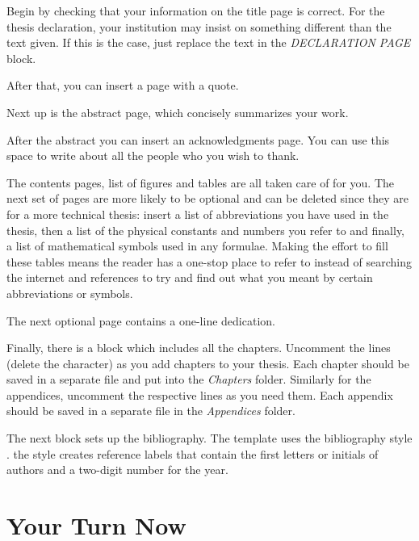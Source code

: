 Begin%
 by checking that your information on the title page is correct. For the thesis declaration, your institution may insist on something different than the text given. If this is the case, just replace the text in the \emph{DECLARATION PAGE} block.

After that, you can insert a page with a quote.

Next up is the abstract page, which concisely summarizes your work.

After the abstract you can insert an acknowledgments page.
 You can use this space to write about all the people who you wish to thank.

The contents pages,%
list of figures and tables are all taken care of for you. The next set of pages are more likely to be optional and can be deleted since they are for a more technical thesis: insert a list of abbreviations you have used in the thesis, then a list of the physical constants and numbers you refer to and finally, a list of mathematical symbols used in any formulae. Making the effort to fill these tables means the reader has a one-stop place to refer to instead of searching the internet and references to try and find out what you meant by certain abbreviations or symbols.

The next optional page contains a one-line dedication.

Finally, there is a block which includes all the chapters. Uncomment the lines (delete the \code{\%} character) as you add chapters to your thesis. Each chapter should be saved in a separate file and put into the \emph{Chapters} folder. Similarly for the appendices, uncomment the respective lines as you need them. Each appendix should be saved in a separate file in the \emph{Appendices} folder.

The next block sets up the bibliography. The template uses the bibliography style . the  style creates reference labels that contain the first letters or initials of authors and a two-digit number for the year.


\section{Your Turn Now}

